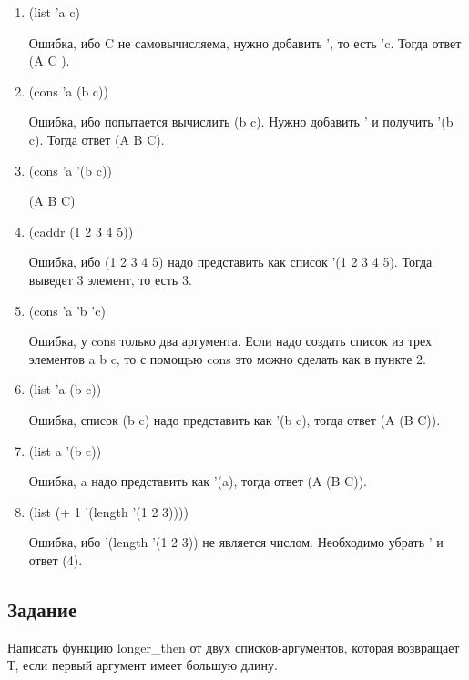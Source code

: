 \begin{enumerate}[label*=\arabic*.]
	\item (list 'a c)
	
	Ошибка, ибо C не самовычисляема, нужно добавить ', то есть 'c. Тогда ответ (A C ).
	
	\item  	(cons 'a (b c))
	
	Ошибка, ибо попытается вычислить (b c). Нужно добавить ' и получить '(b c). Тогда ответ (A B C).
	
	\item (cons 'a '(b c))
	
	(A B C)
	
	\item  (caddr (1 2 3 4 5))
	
	Ошибка, ибо (1 2 3 4 5) надо представить как список '(1 2 3 4 5). Тогда выведет 3 элемент, то есть 3. 
	
	\item (cons 'a 'b 'c)
	
	Ошибка, у cons только два аргумента. Если надо создать список из трех элементов a b c, то с помощью cons это можно сделать как в пункте 2.
	
	\item (list 'a (b c))
	
	Ошибка, список (b c) надо представить как '(b c), тогда ответ (A (B C)).
	
	\item (list a '(b c))
	
	Ошибка, a надо представить как '(a), тогда ответ (A (B C)).
		
	\item (list (+ 1 '(length '(1 2 3))))
	
	Ошибка,  ибо  '(length '(1 2 3)) не является числом. Необходимо убрать ' и ответ (4).

\end{enumerate}

\subsection{Задание }

Написать функцию longer\_then от двух списков-аргументов, которая возвращает Т, если первый аргумент имеет большую длину.


